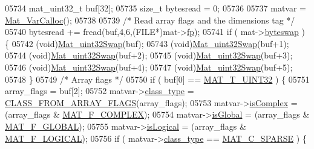 \begin{DoxyCode}
{{{{{{{{{{{{{{{{{{{{{{{{{{{{{{{{{{{05734             mat\_uint32\_t buf[32];
05735             \textcolor{keywordtype}{size\_t} bytesread = 0;
05736 
05737             matvar = \hyperlink{group___m_a_t_gae7c9c3699f6e9c31a9c490300013098c}{Mat\_VarCalloc}();
05738 
05739             \textcolor{comment}{/* Read array flags and the dimensions tag */}
05740             bytesread += fread(buf,4,6,(FILE*)mat->\hyperlink{struct__mat__t_a85f562e407ca9ad4d2a6e14f839432b7}{fp});
05741             \textcolor{keywordflow}{if} ( mat->\hyperlink{struct__mat__t_a99d207977af5e04941ace56d71817a40}{byteswap} ) \{
05742                 (void)\hyperlink{endian_8c_a8cb0d0750e2eaf9840d95db531934f4f}{Mat\_uint32Swap}(buf);
05743                 (void)\hyperlink{endian_8c_a8cb0d0750e2eaf9840d95db531934f4f}{Mat\_uint32Swap}(buf+1);
05744                 (void)\hyperlink{endian_8c_a8cb0d0750e2eaf9840d95db531934f4f}{Mat\_uint32Swap}(buf+2);
05745                 (void)\hyperlink{endian_8c_a8cb0d0750e2eaf9840d95db531934f4f}{Mat\_uint32Swap}(buf+3);
05746                 (void)\hyperlink{endian_8c_a8cb0d0750e2eaf9840d95db531934f4f}{Mat\_uint32Swap}(buf+4);
05747                 (void)\hyperlink{endian_8c_a8cb0d0750e2eaf9840d95db531934f4f}{Mat\_uint32Swap}(buf+5);
05748             \}
05749             \textcolor{comment}{/* Array flags */}
05750             \textcolor{keywordflow}{if} ( buf[0] == \hyperlink{group___m_a_t_ggacf7b3b879282b7ab3a51190e49bf3453aa397e285a23fe240368b752897652c6a}{MAT\_T\_UINT32} ) \{
05751                array\_flags = buf[2];
05752                matvar->\hyperlink{group___m_a_t_aff13035bf3265dd7d9425e5d40c839d4}{class\_type} = \hyperlink{mat5_8c_a85a616d27707e89bda9fd2e9bbb6a586}{CLASS\_FROM\_ARRAY\_FLAGS}(array\_flags);
05753                matvar->\hyperlink{group___m_a_t_aeb03b3a69f108dc05470b00443a43739}{isComplex}  = (array\_flags & \hyperlink{group___m_a_t_ggab9d6ef9e3ddca78a317b173f01d53fbbacd7b091a11184aad7fc6078c04470780}{MAT\_F\_COMPLEX});
05754                matvar->\hyperlink{group___m_a_t_af26c71c4c0ddb14931d15910dddac1bc}{isGlobal}   = (array\_flags & \hyperlink{group___m_a_t_ggab9d6ef9e3ddca78a317b173f01d53fbba49084e0c796aa7963e53f7539525d40d}{MAT\_F\_GLOBAL});
05755                matvar->\hyperlink{group___m_a_t_a866c1539e68073a837833d74cd4a65be}{isLogical}  = (array\_flags & \hyperlink{group___m_a_t_ggab9d6ef9e3ddca78a317b173f01d53fbba57eb5c6e200bcbc0f1b7982f29a169c2}{MAT\_F\_LOGICAL});
05756                \textcolor{keywordflow}{if} ( matvar->\hyperlink{group___m_a_t_aff13035bf3265dd7d9425e5d40c839d4}{class\_type} == \hyperlink{group___m_a_t_ggad4d60ae7b709fc81bfd744fb4c857c40a0d5655b7e6178a2242cb3bb56ff4c8d2}{MAT\_C\_SPARSE} ) \{
}}}}}}}}}}}}}}}}}}}}}}}}}}}}}}}}}}}
\end{DoxyCode}
